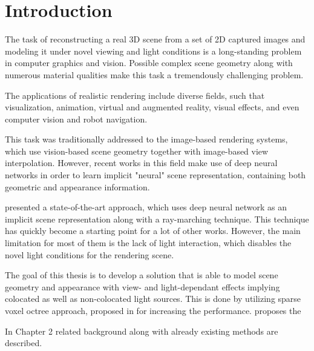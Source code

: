 \chapter{Introduction}
\label{chap:introduction}

The task of reconstructing a real 3D scene from a set of 2D captured images
and modeling it under novel viewing and light conditions
is a long-standing problem in computer graphics and vision.
Possible complex scene geometry along with numerous material qualities
make this task a tremendously challenging problem.

The applications of realistic rendering include diverse fields, such that
visualization, animation, virtual and augmented reality, visual effects,
and even computer vision and robot navigation.

This task was traditionally addressed to the image-based rendering systems,
which use vision-based scene geometry together with image-based view interpolation. \cite{shumandkang2000}
However, recent works in this field make use of deep neural networks
in order to learn implicit "neural" scene representation,
containing both geometric and appearance information. \cite{tewari2020state}

\cite{mildenhall2020nerf} presented a state-of-the-art approach,
which uses deep neural network as an implicit scene representation
along with a ray-marching technique. 
This technique has quickly become a starting point for a lot of other works. 
However, the main limitation for most of them is the lack of light interaction,
which disables the novel light conditions for the rendering scene.

The goal of this thesis is to develop a solution
that is able to model scene geometry and appearance
with view- and light-dependant effects
implying colocated as well as non-colocated light sources.
This is done by utilizing sparse voxel octree approach,
proposed in \cite{liu2021neural} for increasing the performance.
\cite{bi2020neural} proposes the




In Chapter 2 related background along with already existing methods are described.

